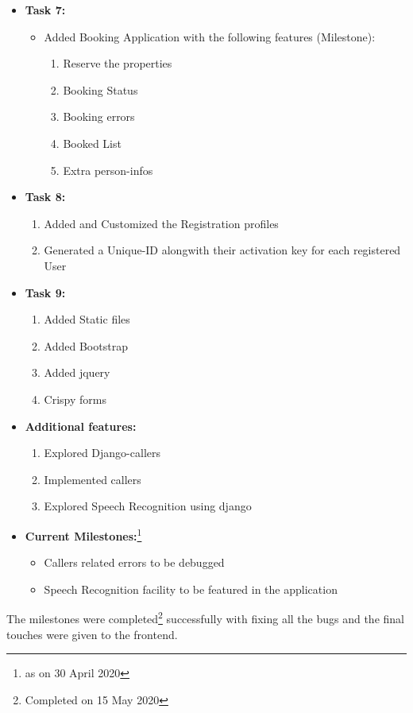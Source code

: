 \documentclass[12pt]{report}
\begin{document}
\begin{itemize}
\begin{enumerate}
\end{enumerate}
\item \textbf{Task 7:}
\begin{itemize}
\item Added Booking Application with the following features (Milestone):
\begin{enumerate}
\item Reserve the properties
\item Booking Status
\item Booking errors
\item Booked List
\item Extra person-infos
\end{enumerate}
\end{itemize}
\item \textbf{Task 8:}
\begin{enumerate}
\item Added and Customized the Registration profiles
\item Generated a Unique-ID alongwith their activation key for each registered User
\end{enumerate}
\item \textbf{Task 9:}
\begin{enumerate}
\item Added Static files
\item Added Bootstrap
\item Added jquery
\item Crispy forms
\end{enumerate}
\item \textbf{Additional features:}
\begin{enumerate}
\item Explored Django-callers
\item Implemented callers
\item Explored Speech Recognition using django
\end{enumerate}
\item \textbf{Current Milestones:}\footnote{as on 30 April 2020}
\begin{itemize}
\item Callers related errors to be debugged
\item Speech Recognition facility to be featured in the application 
\end{itemize}
\end{itemize}

The milestones were completed\footnote{Completed on 15 May 2020} successfully with fixing all the bugs and the final touches were given to the frontend.
\end{document}
